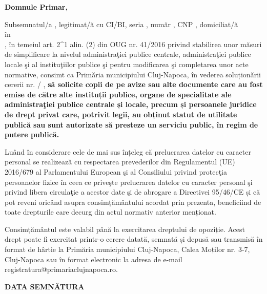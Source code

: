 \documentclass[11pt,a4paper]{article}
\newcommand{\fillline}[1][6cm]{\underline{\hspace{#1}}}
\begin{document}
\vspace{1cm}

\begin{center}
\textbf{Domnule Primar,}
\end{center}

\vspace{1cm}

\hspace{1cm}Subsemnatul/a \fillline[8cm], legitimat/ă cu CI/BI, seria \fillline[1.5cm], număr \fillline[3cm], CNP \fillline[5cm], domiciliat/ă\\
în \hrulefill\\
\hrulefill, în temeiul art. 2\textasciicircum1 alin. (2) din OUG nr. 41/2016 privind stabilirea unor măsuri de simplificare la nivelul administraţiei publice centrale, administraţiei publice locale şi al instituţiilor publice şi pentru modificarea şi completarea unor acte normative, consimt ca Primăria municipiului Cluj-Napoca, în vederea soluționării cererii nr. \fillline[3cm] / \fillline[2cm], \textbf{să solicite copii de pe avize sau alte documente care au fost emise de către alte instituții publice, organe de specialitate ale administraţiei publice centrale și locale, precum și persoanele juridice de drept privat care, potrivit legii, au obținut statut de utilitate publică sau sunt autorizate să presteze un serviciu public, în regim de putere publică.}

\vspace{0.4cm}

\hspace{1cm}Luând în considerare cele de mai sus înțeleg că prelucrarea datelor cu caracter personal se realizează cu respectarea prevederilor din Regulamentul (UE) 2016/679 al Parlamentului European şi al Consiliului privind protecţia persoanelor fizice în ceea ce priveşte prelucrarea datelor cu caracter personal şi privind libera circulaţie a acestor date şi de abrogare a Directivei 95/46/CE și că pot reveni oricând asupra consimțământului acordat prin prezenta, beneficiind de toate drepturile care decurg din actul normativ anterior menționat.

\vspace{0.4cm}

\hspace{1cm}Consimțământul este valabil până la exercitarea dreptului de opoziție. Acest drept poate fi exercitat printr-o cerere datată, semnată și depusă sau transmisă în format de hârtie la Primăria municipiului Cluj-Napoca, Calea Moților nr. 3-7, Cluj-Napoca sau în format electronic la adresa de e-mail registratura@primariaclujnapoca.ro.

\vspace{3cm}

\textbf{DATA} \fillline[5cm] \hfill \textbf{SEMNĂTURA} \fillline[5cm]
\end{document}
